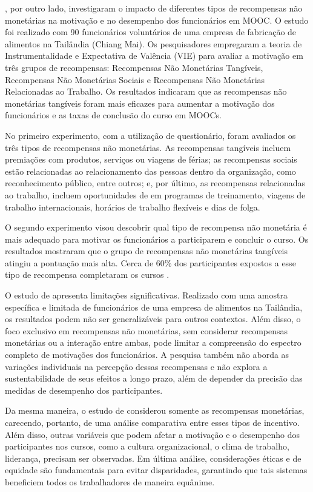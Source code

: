 \documentclass[portuguese]{textolivre}
\begin{document}
\textcite{sureephong_effect_2020}, por outro lado, investigaram o impacto de diferentes tipos de recompensas não monetárias na motivação e no desempenho dos funcionários em MOOC. O estudo foi realizado com 90 funcionários voluntários de uma empresa de fabricação de alimentos na Tailândia (Chiang Mai). Os pesquisadores empregaram a teoria de Instrumentalidade e Expectativa de Valência (VIE) para avaliar a motivação em três grupos de recompensas: Recompensas Não Monetárias Tangíveis, Recompensas Não Monetárias Sociais e Recompensas Não Monetárias Relacionadas ao Trabalho. Os resultados indicaram que as recompensas não monetárias tangíveis foram mais eficazes para aumentar a motivação dos funcionários e as taxas de conclusão do curso em MOOCs.

No primeiro experimento, com a utilização de questionário, foram avaliados os três tipos de recompensas não monetárias. As recompensas tangíveis incluem premiações com produtos, serviços ou viagens de férias; as recompensas sociais estão relacionadas ao relacionamento das pessoas dentro da organização, como reconhecimento público, entre outros; e, por último, as recompensas relacionadas ao trabalho, incluem oportunidades de em programas de treinamento, viagens de trabalho internacionais, horários de trabalho flexíveis e dias de folga.  

O segundo experimento visou descobrir qual tipo de recompensa não monetária é mais adequado para motivar os funcionários a participarem e concluir o curso. Os resultados mostraram que o grupo de recompensas não monetárias tangíveis atingiu a pontuação mais alta.  Cerca de 60\% dos participantes expostos a esse tipo de recompensa completaram os cursos \cite{sureephong_effect_2020}.   

O estudo de \textcite{sureephong_effect_2020} apresenta limitações significativas. Realizado com uma amostra específica e limitada de funcionários de uma empresa de alimentos na Tailândia, os resultados podem não ser generalizáveis para outros contextos. Além disso, o foco exclusivo em recompensas não monetárias, sem considerar recompensas monetárias ou a interação entre ambas, pode limitar a compreensão do espectro completo de motivações dos funcionários. A pesquisa também não aborda as variações individuais na percepção dessas recompensas e não explora a sustentabilidade de seus efeitos a longo prazo, além de depender da precisão das medidas de desempenho dos participantes. 

Da mesma maneira, o estudo de \textcite{yan_construction_2022} considerou somente as recompensas monetárias, carecendo, portanto, de uma análise comparativa entre esses tipos de incentivo.  Além disso, outras variáveis que podem afetar a motivação e o desempenho dos participantes nos cursos, como a cultura organizacional, o clima de trabalho, liderança, precisam ser observadas. Em última análise, considerações éticas e de equidade são fundamentais para evitar disparidades, garantindo que tais sistemas beneficiem todos os trabalhadores de maneira equânime.
\end{document}
